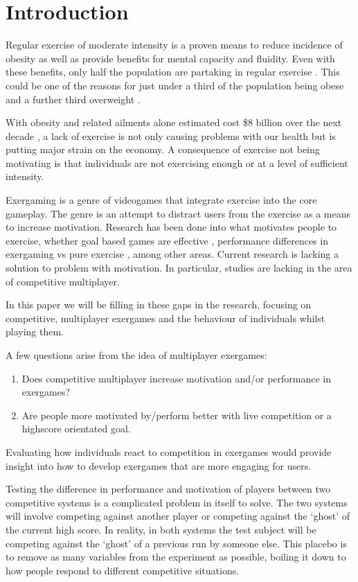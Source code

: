 \documentclass[a4paper, 11pt]{article}
\begin{document}
\section{Introduction}
\begin{multicols}{2}

Regular exercise of moderate intensity is a proven means to reduce incidence of obesity as well as provide benefits for mental capacity and fluidity. Even with these benefits, only half the population are partaking in regular exercise \cite{ministry2013new}. This could be one of the reasons for just under a third of the population being obese and a further third overweight \cite{ministry2013new}.

With obesity and related ailments alone estimated cost \$8 billion over the next decade \cite{lal2012health}, a lack of exercise is not only causing problems with our health but is putting major strain on the economy. A consequence of exercise not being motivating \cite{bartholomew2005college} is that individuals are not exercising enough or at a level of sufficient intensity.

Exergaming is a genre of videogames that integrate exercise into the core gameplay. The genre is an attempt to distract users from the exercise as a means to increase motivation. Research has been done into what motivates people to exercise, whether goal based games are effective \cite{jin2010does}, performance differences in exergaming vs pure exercise \cite{kraft2011heart,maddison2009feasibility}, among other areas. Current research is lacking a solution to problem with motivation. In particular, studies are lacking in the area of competitive multiplayer.

In this paper we will be filling in these gaps in the research, focusing on competitive, multiplayer exergames and the behaviour of individuals whilst playing them.

A few questions arise from the idea of multiplayer exergames:

\begin{enumerate}
	\item Does competitive multiplayer increase motivation and/or performance in exergames?
	\item Are people more motivated by/perform better with live competition or a highscore orientated goal.
\end{enumerate}

Evaluating how individuals react to competition in exergames would provide insight into how to develop exergames that are more engaging for users. 

Testing the difference in performance and motivation of players between two competitive systems is a complicated problem in itself to solve. The two systems will involve competing against another player or competing against the `ghost' of the current high score. In reality, in both systems the test subject will be competing against the `ghost' of a previous run by someone else. This placebo is to remove as many variables from the experiment as possible, boiling it down to how people respond to different competitive situations.

\end{multicols}
\end{document}
